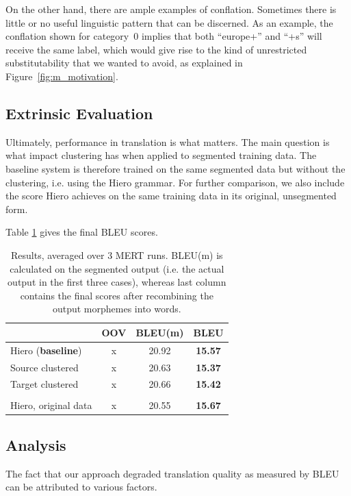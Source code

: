 On the other hand, there are ample examples of conflation. Sometimes there is little or no useful linguistic pattern that can be discerned.
As an example, the conflation shown for category~0 implies that both ``europe+'' and ``+s'' will receive the same label, which would give rise to the kind of unrestricted substitutability that we wanted to avoid, as explained in Figure~\ref{fig:m_motivation}.

\subsection{Extrinsic Evaluation}
Ultimately, performance in translation is what matters.
The main question is what impact clustering has when applied to segmented training data.
The baseline system is therefore trained on the same segmented data but without the clustering, i.e. using the Hiero grammar.
For further comparison, we also include the score Hiero achieves on the same training data in its original, unsegmented form.

Table \ref{tbl:m_bleu} gives the final BLEU scores.

\begin{table}[htb]
  \centering
  \begin{tabular}{|l|c|c|c|} \hline
     & \textbf{OOV} & \textbf{BLEU}(m) & \textbf{BLEU} \\ \hline 
    Hiero (\textbf{baseline}) & x & 20.92  & \textbf{15.57} \\ \hline
    Source clustered & x & 20.63 & \textbf{15.37} \\ \hline
    Target clustered & x & 20.66 & \textbf{15.42} \\ \hline
    \multicolumn{3}{c}{ } \\ \hline
    Hiero, original data & x & 20.55 & \textbf{15.67} \\ \hline
  \end{tabular}
  \caption{Results, averaged over 3 MERT runs. BLEU(m) is calculated on the segmented output (i.e. the actual output in the first three cases), whereas last column contains the final scores after recombining the output morphemes into words.}
  \label{tbl:m_bleu}
\end{table}

\subsection{Analysis} \label{sec:m_analysis}
The fact that our approach degraded translation quality as measured by BLEU can be attributed to various factors.

